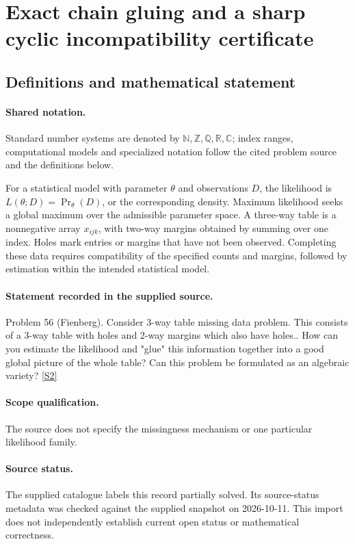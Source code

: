 \documentclass[11pt]{article}
\newcommand{\sref}[2]{\hyperlink{source:#1:#2}{[S#2]}}
\begin{document}
\section{Exact chain gluing and a sharp cyclic incompatibility certificate}\label{statement}

\subsection{Definitions and mathematical statement}

\paragraph{Shared notation.}Standard number systems are denoted by $\mathbb N,\mathbb Z,\mathbb Q,\mathbb R,\mathbb C$; index ranges, computational models and specialized notation follow the cited problem source and the definitions below.


For a statistical model with parameter $\theta$ and observations $D$, the likelihood is $L(\theta;D)=\Pr_\theta(D)$, or the corresponding density. Maximum likelihood seeks a global maximum over the admissible parameter space. A three-way table is a nonnegative array $x_{ijk}$, with two-way margins obtained by summing over one index. Holes mark entries or margins that have not been observed. Completing these data requires compatibility of the specified counts and margins, followed by estimation within the intended statistical model.
\paragraph{Statement recorded in the supplied source.}
Problem 56 (Fienberg). Consider 3-way table missing data problem. This consists of a 3-way table with holes and 2-way margins which also have holes.. How can you estimate the likelihood and "glue" this information together into a good global picture of the whole table? Can this problem be formulated as an algebraic variety? \sref{statement}{2}
\paragraph{Scope qualification.}
The source does not specify the missingness mechanism or one particular likelihood family.
\paragraph{Source status.}
The supplied catalogue labels this record partially solved. Its source-status metadata was checked against the supplied snapshot on 2026-10-11. This import does not independently establish current open status or mathematical correctness.
\end{document}
